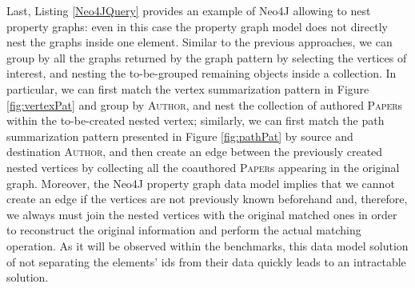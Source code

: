 Last, Listing \vref{Neo4JQuery} provides an example of Neo4J allowing to nest property graphs: even in this case the property graph model does not directly  nest the graphs inside one element. Similar to the previous approaches, we can group by all the graphs returned by the graph pattern by selecting the vertices of interest, and nesting the to-be-grouped remaining objects inside a collection. In particular, we can first match the vertex summarization pattern in Figure \vref{fig:vertexPat} and group by \textsc{Author}, and nest the collection of authored \textsc{Paper}s within the to-be-created nested vertex; similarly, we can first match the path summarization pattern presented in Figure \ref{fig:pathPat} by source and destination \textsc{Author}, and then create an edge between the previously created nested vertices by collecting all the coauthored \textsc{Paper}s appearing in the original graph. Moreover, the Neo4J property graph data model implies that we cannot create an edge if the vertices are not previously known beforehand and, therefore, we always must join the nested vertices with the original matched ones in order to reconstruct the original information and perform the actual matching operation. As it will be observed within the benchmarks, this data model solution of not separating the elements' ids from their data quickly leads to an intractable solution. 